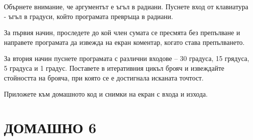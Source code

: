 \documentclass[12pt, a4paper]{article}
\begin{document}
\begin{enumerate}
			Обърнете внимание, че аргументът е ъгъл в радиани. Пуснете вход от клавиатура - ъгъл в градуси, който програмата превръща в радиани.
			
			
			За първия начин, проследете до кой член сумата се пресмята без препълване и направете програмата да извежда на екран коментар, когато става препълването.
			
			
			За втория начин пуснете програмата с различни входове – 30 градуса, 15 грядуса, 5 градуса и 1 градус. Поставете в итеративния цикъл брояч и извеждайте стойността на брояча, при която се е достигнала исканата точтост. 
			
			
			Приложете към домашното код и снимки на екран с входа и изхода.
		\end{enumerate}
	\newpage
	\section{ДОМАШНО 6}
	\\
\end{document}
